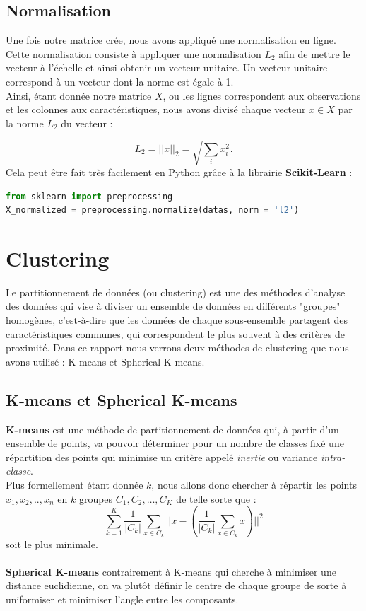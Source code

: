 \documentclass[runningheads]{llncs}
\begin{document}
\subsection{Normalisation}
\label{norm}

Une fois notre matrice crée, nous avons appliqué une normalisation en ligne.
Cette normalisation consiste à appliquer une normalisation $L_2$ afin de mettre le vecteur à l'échelle et ainsi obtenir un vecteur unitaire. Un vecteur unitaire correspond à un vecteur dont la norme est égale à 1. \\
Ainsi, étant donnée notre matrice $X$, ou les lignes correspondent aux observations et les colonnes aux caractéristiques, nous avons divisé chaque vecteur $x \in X$ par la norme $L_2$ du vecteur :

$$L_2 =  ||x||_{2} = \sqrt{\sum_{i} x_{i}^2 }.$$
\linebreak
Cela peut être fait très facilement en Python grâce à la librairie \textbf{Scikit-Learn} \cite{scikit-learn} :

\begin{lstlisting}[language=Python]
from sklearn import preprocessing
X_normalized = preprocessing.normalize(datas, norm = 'l2')
\end{lstlisting}

\section{Clustering}

Le partitionnement de données (ou clustering) est une des méthodes d'analyse des données qui vise à diviser un ensemble de données en différents "groupes" homogènes, c'est-à-dire que les données de chaque sous-ensemble partagent des caractéristiques communes, qui correspondent le plus souvent à des critères de proximité. Dans ce rapport nous verrons deux méthodes de clustering que nous avons utilisé : K-means et Spherical K-means.

\subsection{K-means et Spherical K-means}

\textbf{K-means} est une méthode de partitionnement de données qui, à partir d'un ensemble de points, va pouvoir déterminer pour un nombre de classes fixé une répartition des points qui minimise un critère appelé \textit{inertie} ou variance \textit{intra-classe}. \\
Plus formellement étant donnée $k$,  nous allons donc chercher à répartir les points $x_{1}, x_{2}, .., x_{n}$ en $k$ groupes $C_{1},C_{2},…,C_{K}$ de telle sorte que :
$$ \sum_{k=1}^K \frac {1}{|C_{k}|}  \sum_{x\in C_{k}} || x - ( \frac{1}{|C_{k}|} \sum_{x\in C_{k}} x) ||^2 $$ soit le plus minimale.
\\ \\
\textbf{Spherical K-means} contrairement à K-means qui cherche à minimiser une distance euclidienne, on va plutôt définir le centre de chaque groupe de sorte à uniformiser et minimiser l'angle entre les composants.
\end{document}
